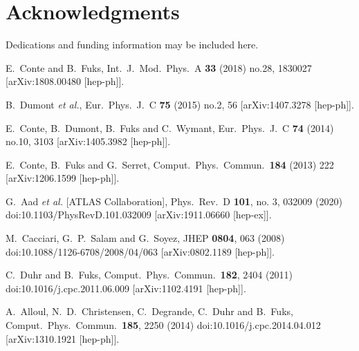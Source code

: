 \documentclass{ws-mpla}
\begin{document}
\section*{Acknowledgments}
Dedications and funding information may be included here.

\begin{thebibliography}{99}
  E.~Conte and B.~Fuks,
  Int.\ J.\ Mod.\ Phys.\ A {\bf 33} (2018) no.28,  1830027
  [arXiv:1808.00480 [hep-ph]].

  B.~Dumont {\it et al.},
  Eur.\ Phys.\ J.\ C {\bf 75} (2015) no.2,  56
  [arXiv:1407.3278 [hep-ph]].

  E.~Conte, B.~Dumont, B.~Fuks and C.~Wymant,
  Eur.\ Phys.\ J.\ C {\bf 74} (2014) no.10,  3103
  [arXiv:1405.3982 [hep-ph]].

  E.~Conte, B.~Fuks and G.~Serret,
  Comput.\ Phys.\ Commun.\  {\bf 184} (2013) 222
  [arXiv:1206.1599 [hep-ph]].

  G.~Aad {\it et al.} [ATLAS Collaboration],
  Phys.\ Rev.\ D {\bf 101}, no. 3, 032009 (2020)
  doi:10.1103/PhysRevD.101.032009
  [arXiv:1911.06660 [hep-ex]].

  M.~Cacciari, G.~P.~Salam and G.~Soyez,
  JHEP {\bf 0804}, 063 (2008)
  doi:10.1088/1126-6708/2008/04/063
  [arXiv:0802.1189 [hep-ph]].

  C.~Duhr and B.~Fuks,
  Comput.\ Phys.\ Commun.\  {\bf 182}, 2404 (2011)
  doi:10.1016/j.cpc.2011.06.009
  [arXiv:1102.4191 [hep-ph]].
  
  A.~Alloul, N.~D.~Christensen, C.~Degrande, C.~Duhr and B.~Fuks,
  Comput.\ Phys.\ Commun.\  {\bf 185}, 2250 (2014)
  doi:10.1016/j.cpc.2014.04.012
  [arXiv:1310.1921 [hep-ph]].


\end{thebibliography}
\end{document}
